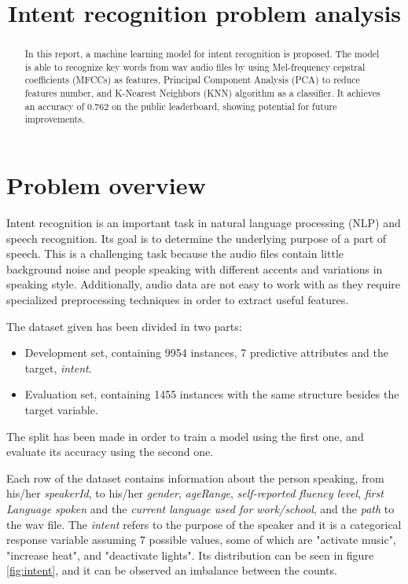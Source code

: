 \documentclass[conference]{IEEEtran}
\begin{document}
\title{Intent recognition problem analysis}

\author{
}

\maketitle

\begin{abstract}
    In this report, a machine learning model for intent recognition is proposed.
    The model is able to recognize key words from wav audio files by using Mel-frequency cepstral coefficients (MFCCs) as features, Principal Component Analysis (PCA) to reduce features number, and K-Nearest Neighbors (KNN) algorithm as a classifier.
    It achieves an accuracy of 0.762 on the public leaderboard, showing potential for future improvements.
\end{abstract}

\section{Problem overview}
Intent recognition is an important task in natural language processing (NLP) and speech recognition.
Its goal is to determine the underlying purpose of a part of speech.
This is a challenging task because the audio files contain little background noise and people speaking with different accents and variations in speaking style.
Additionally, audio data are not easy to work with as they require specialized preprocessing techniques in order to extract useful features.

The dataset given has been divided in two parts:
\begin{itemize}
    \item Development set, containing 9954 instances, 7 predictive attributes and the target, \textit{intent}.
    \item Evaluation set, containing 1455 instances with the same structure besides the target variable.
\end{itemize}
The split has been made in order to train a model using the first one, and evaluate its accuracy using the second one.

Each row of the dataset contains information about the person speaking, from his/her \textit{speakerId}, to his/her \textit{gender}, \textit{ageRange}, \textit{self-reported fluency level}, \textit{first Language spoken} and the \textit{current language used for work/school}, and the \textit{path} to the wav file.
The \textit{intent} refers to the purpose of the speaker and it is a categorical response variable assuming 7 possible values, some of which are "activate music", "increase heat", and "deactivate lights".
Its distribution can be seen in figure \ref{fig:intent}, and it can be observed an imbalance between the counts.
\end{document}
